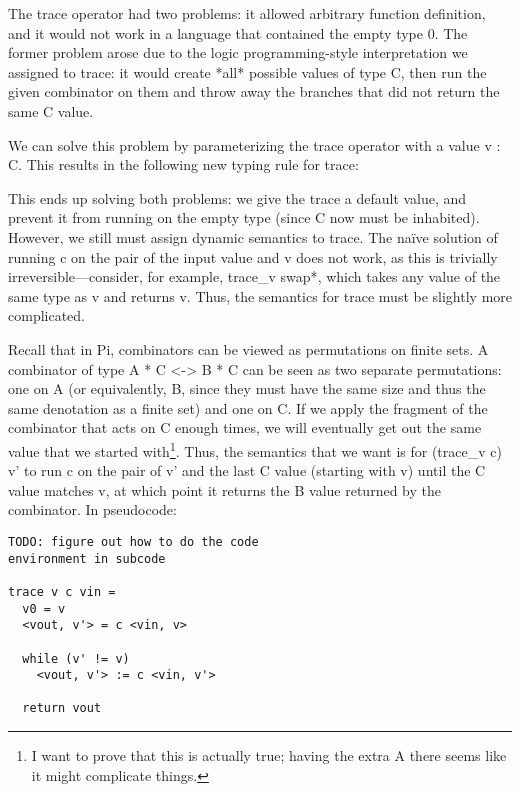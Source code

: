 \documentclass{sigplanconf}
\begin{document}
The trace operator had two problems: it allowed arbitrary function definition,
and it would not work in a language that contained the empty type {{0}}. The
former problem arose due to the logic programming-style interpretation we
assigned to trace: it would create *all* possible values of type {{C}}, then run
the given combinator on them and throw away the branches that did not return the
same {{C}} value.

We can solve this problem by parameterizing the trace operator with a value {{v
: C}}. This results in the following new typing rule for trace:


\noindent
This ends up solving both problems: we give the trace a default value, and
prevent it from running on the empty type (since {{C}} now must be inhabited).
However, we still must assign dynamic semantics to trace. The na\"ive solution
of running {{c}} on the pair of the input value and {{v}} does not work, as this
is trivially irreversible---consider, for example, {{trace_v swap*}}, which
takes any value of the same type as {{v}} and returns {{v}}. Thus, the semantics
for {{trace}} must be slightly more complicated.

Recall that in {{Pi}}, combinators can be viewed as permutations on finite sets.
A combinator of type {{A * C <-> B * C}} can be seen as two separate
permutations: one on {{A}} (or equivalently, B, since they must have the same
size and thus the same denotation as a finite set) and one on {{C}}. If we
apply the fragment of the combinator that acts on {{C}} enough times, we will
eventually get out the same value that we started with\footnote{I want to prove
that this is actually true; having the extra {{A}} there seems like it might
complicate things.}. Thus, the semantics that we want is for {{(trace_v c) v'}}
to run {{c}} on the pair of {{v'}} and the last {{C}} value (starting with
{{v}}) until the {{C}} value matches {{v}}, at which point it returns the {{B}}
value returned by the combinator. In pseudocode:

\begin{verbatim}
TODO: figure out how to do the code 
environment in subcode

trace v c vin =
  v0 = v
  <vout, v'> = c <vin, v>

  while (v' != v)
    <vout, v'> := c <vin, v'>

  return vout
\end{verbatim}
\end{document}
